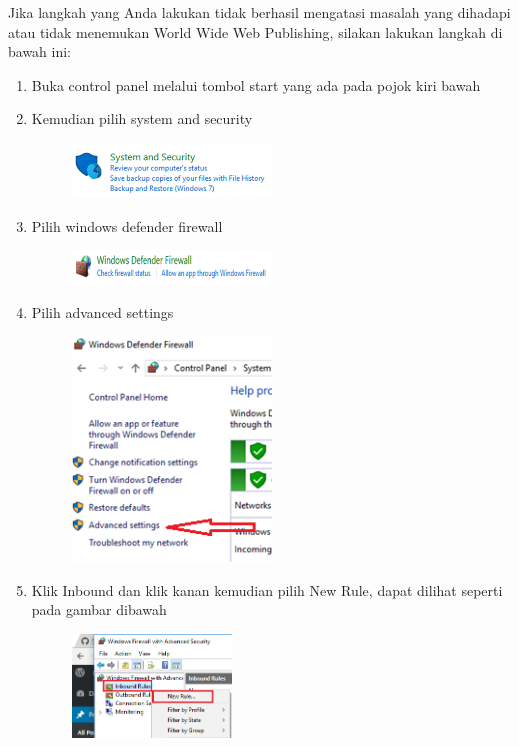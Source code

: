 Jika langkah yang Anda lakukan tidak berhasil mengatasi masalah yang dihadapi atau tidak menemukan World Wide Web Publishing, silakan lakukan langkah di bawah ini:
\begin{enumerate}
    \item Buka control panel melalui tombol start yang ada pada pojok kiri bawah
    
    \item Kemudian pilih system and security
		\begin{figure}[!htbp]
    		\centering
    		\includegraphics[width=0.5\textwidth]{figures/XAMPP/Xampp12.PNG}
    		\label{Xampp12}
		\end{figure}
		
	\item Pilih windows defender firewall
		\begin{figure}[!htbp]
    		\centering
    		\includegraphics[width=0.5\textwidth]{figures/XAMPP/Xampp13.PNG}
    		\label{Xampp13}
		\end{figure}
		
	\item Pilih advanced settings
		\begin{figure}[!htbp]
    		\centering
    		\includegraphics[width=0.5\textwidth]{figures/XAMPP/Xampp14.PNG}
    		\label{Xampp14}
		\end{figure}
		
	\item Klik Inbound dan klik kanan kemudian pilih New Rule, dapat dilihat seperti pada gambar dibawah
		\begin{figure}[!htbp]
    		\centering
    		\includegraphics[width=0.4\textwidth]{figures/XAMPP/Xampp15.png}
    		\label{Xampp15}
		\end{figure}
		

\end{enumerate}
